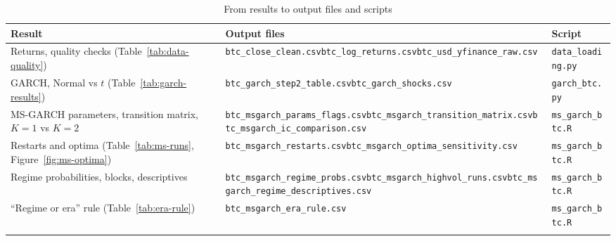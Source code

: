 \documentclass[12pt,a4paper]{article}
\begin{document}
\begin{table}[H]
	\centering
	\footnotesize
	\caption{From results to output files and scripts}
	\label{tab:trace}
	\raggedright
	\begin{tabular}{p{3.9cm}p{6.2cm}p{3.3cm}}
		\toprule
		Result & Output files & Script \\
		\midrule
		Returns, quality checks (Table~\ref{tab:data-quality}) & \texttt{btc\_\allowbreak{}close\_\allowbreak{}clean.csv}\newline \texttt{btc\_\allowbreak{}log\_\allowbreak{}returns.csv}\newline \texttt{btc\_\allowbreak{}usd\_\allowbreak{}yfinance\_\allowbreak{}raw.csv} & \texttt{data\_\allowbreak{}loading.py} \\
		\addlinespace
		GARCH, Normal vs $t$ (Table~\ref{tab:garch-results}) & \texttt{btc\_\allowbreak{}garch\_\allowbreak{}step2\_\allowbreak{}table.csv}\newline \texttt{btc\_\allowbreak{}garch\_\allowbreak{}shocks.csv} & \texttt{garch\_\allowbreak{}btc.py} \\
		\addlinespace
		MS-GARCH parameters, transition matrix, $K=1$ vs $K=2$ & \texttt{btc\_\allowbreak{}msgarch\_\allowbreak{}params\_\allowbreak{}flags.csv}\newline \texttt{btc\_\allowbreak{}msgarch\_\allowbreak{}transition\_\allowbreak{}matrix.csv}\newline \texttt{btc\_\allowbreak{}msgarch\_\allowbreak{}ic\_\allowbreak{}comparison.csv} & \texttt{ms\_\allowbreak{}garch\_\allowbreak{}btc.R} \\
		\addlinespace
		Restarts and optima (Table~\ref{tab:ms-runs}, Figure~\ref{fig:ms-optima}) & \texttt{btc\_\allowbreak{}msgarch\_\allowbreak{}restarts.csv}\newline \texttt{btc\_\allowbreak{}msgarch\_\allowbreak{}optima\_\allowbreak{}sensitivity.csv} & \texttt{ms\_\allowbreak{}garch\_\allowbreak{}btc.R} \\
		\addlinespace
		Regime probabilities, blocks, descriptives & \texttt{btc\_\allowbreak{}msgarch\_\allowbreak{}regime\_\allowbreak{}probs.csv}\newline \texttt{btc\_\allowbreak{}msgarch\_\allowbreak{}highvol\_\allowbreak{}runs.csv}\newline \texttt{btc\_\allowbreak{}msgarch\_\allowbreak{}regime\_\allowbreak{}descriptives.csv} & \texttt{ms\_\allowbreak{}garch\_\allowbreak{}btc.R} \\
		\addlinespace
		``Regime or era'' rule (Table~\ref{tab:era-rule}) & \texttt{btc\_\allowbreak{}msgarch\_\allowbreak{}era\_\allowbreak{}rule.csv} & \texttt{ms\_\allowbreak{}garch\_\allowbreak{}btc.R} \\
		\addlinespace
		\bottomrule
	\end{tabular}
\end{table}
\end{document}

